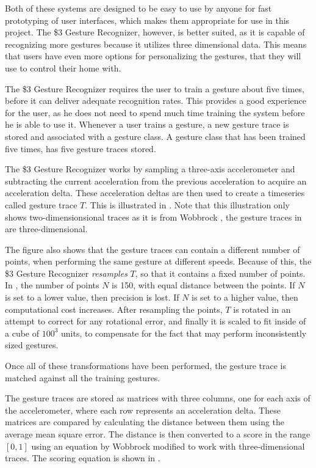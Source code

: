 Both of these systems are designed to be easy to use by anyone for fast prototyping of user interfaces, 
which makes them appropriate for use in this project.
The \$3 Gesture Recognizer, however, is better suited, 
as it is capable of recognizing more gestures because it utilizes three dimensional data.
This means that users have even more options for personalizing the gestures, 
that they will use to control their home with.

The \$3 Gesture Recognizer requires the user to train a gesture about five times, 
before it can deliver adequate recognition rates. 
This provides a good experience for the user, 
as he does not need to spend much time training the system before he is able to use it.
Whenever a user trains a gesture, 
a new gesture trace is stored and associated with a gesture class. 
A gesture class that has been trained five times, 
has five gesture traces stored.

The \$3 Gesture Recognizer works by sampling a three-axis accelerometer and subtracting the current acceleration from the previous acceleration to acquire an acceleration delta.
These acceleration deltas are then used to create a timeseries called gesture trace $T$.
This is illustrated in . 
Note that this illustration only shows two-dimensionsional traces as it is from Wobbrock \etal \cite{wobbrock2007gestures}, the gesture traces in \cite{threedollar} are three-dimensional. 

The figure also shows that the gesture traces can contain a different number of points, 
when performing the same gesture at different speeds.
Because of this, the \$3 Gesture Recognizer \emph{resamples} $T$, 
so that it contains a fixed number of points. 
In \cite{threedollar}, the number of points $N$ is \num{150}, 
with equal distance between the points.
If $N$ is set to a lower value, then precision is lost. 
If $N$ is set to a higher value, then computational cost increases.
After resampling the points, 
$T$ is rotated in an attempt to correct for any rotational error, 
and finally it is scaled to fit inside of a cube of $100^3$ units, 
to compensate for the fact that may perform inconsistently sized gestures.

Once all of these transformations have been performed, 
the gesture trace is matched against all the training gestures. 

The gesture traces are stored as matrices with three columns, one for each axis of the accelerometer, where each row represents an acceleration delta.
These matrices are compared by calculating the distance between them using the average mean square error.
The distance is then converted to a score in the range $[0,1]$ using an equation by Wobbrock \etal modified to work with three-dimensional traces.
The scoring equation is shown in .

